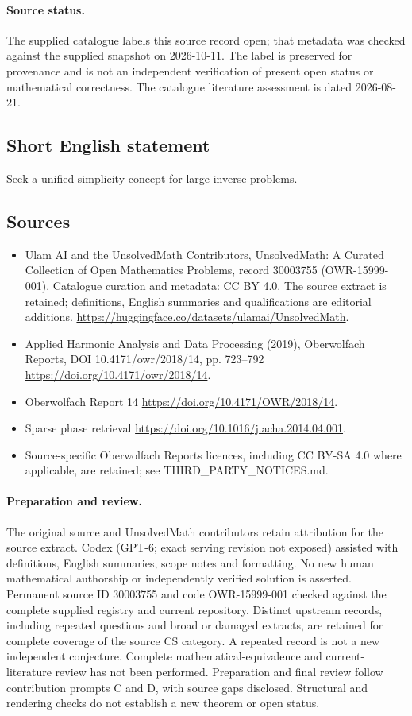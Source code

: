 \documentclass[11pt]{article}
\begin{document}
\paragraph{Source status.}
The supplied catalogue labels this source record open; that metadata was checked against the supplied snapshot on 2026-10-11. The label is preserved for provenance and is not an independent verification of present open status or mathematical correctness. The catalogue literature assessment is dated 2026-08-21.
\subsection{Short English statement}
Seek a unified simplicity concept for large inverse problems.
\subsection{Sources}
\begin{itemize}
\item[S1] Ulam AI and the UnsolvedMath Contributors, UnsolvedMath: A Curated Collection of Open Mathematics Problems, record 30003755 (OWR-15999-001). Catalogue curation and metadata: CC BY 4.0. The source extract is retained; definitions, English summaries and qualifications are editorial additions.
\url{https://huggingface.co/datasets/ulamai/UnsolvedMath}.
\item[S2] Applied Harmonic Analysis and Data Processing (2019), Oberwolfach Reports, DOI 10.4171/owr/2018/14, pp. 723--792
\url{https://doi.org/10.4171/owr/2018/14}.
\item[S3] Oberwolfach Report 14
\url{https://doi.org/10.4171/OWR/2018/14}.
\item[S4] Sparse phase retrieval
\url{https://doi.org/10.1016/j.acha.2014.04.001}.
\item Source-specific Oberwolfach Reports licences, including CC BY-SA 4.0 where applicable, are retained; see THIRD\_PARTY\_NOTICES.md.
\end{itemize}
\paragraph{Preparation and review.}
The original source and UnsolvedMath contributors retain attribution for the source extract. Codex (GPT-6; exact serving revision not exposed) assisted with definitions, English summaries, scope notes and formatting. No new human mathematical authorship or independently verified solution is asserted. Permanent source ID 30003755 and code OWR-15999-001 checked against the complete supplied registry and current repository. Distinct upstream records, including repeated questions and broad or damaged extracts, are retained for complete coverage of the source CS category. A repeated record is not a new independent conjecture. Complete mathematical-equivalence and current-literature review has not been performed. Preparation and final review follow contribution prompts C and D, with source gaps disclosed. Structural and rendering checks do not establish a new theorem or open status.
\label{end:30003755}
\end{document}
